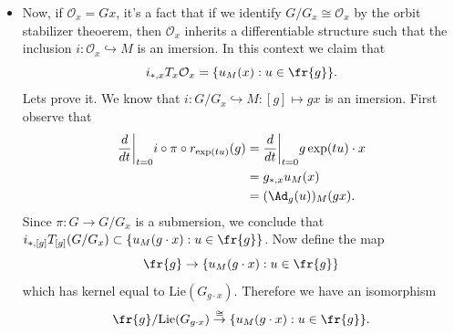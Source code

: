 \begin{itemize}
        \begin{equation}
            \text{Lie}(G_x)=\fr{g}_x.
        \end{equation}
        Let $\exp(tu)\in G_x,\;\forall t\in\bbR$, that is, assume that $u\in\text{Lie}(G_x)$. Then, by definition, we have 
        $\exp(tu)x=x$. So, by differentiating this equation we get $u_M(x)=0$ and $u\in\fr{g}_x$. Conversely, assume that 
        $u\in\fr{g}_x$. Let $g=\exp(ts),\;s\in\bbR$, then 
        \begin{equation}
            \frac{d}{dt}\bigg|_{t=s}\exp(tu)x= g_{*,x}(\frac{d}{dt}\bigg|_{t=0}\exp(tu)x)=0
        \end{equation}
        and $\exp(tu)\cdot x = x,\forall t\in\bbR$. Therefore $u\in\text{Lie}(G_x)$.
        \item Now, if $\mathcal{O}_x=Gx$, it's a fact that if we identify $G/G_x\cong \mathcal{O}_x$ by the 
        orbit stabilizer theoerem, then $\mathcal{O}_x$ inherits a differentiable structure such that the inclusion 
        $i:\mathcal{O}_x\hookrightarrow M$ is an imersion. In this context we claim that 
        \begin{equation}
            i_{*,x}T_x\mathcal{O}_x=\{u_M(x): u\in\fr{g}\}.
        \end{equation}
        Lets prove it. We know that $i:G/G_x\hookrightarrow M:[g]\mapsto gx$ is an imersion. First observe that 
        \begin{equation}
            \begin{split}
                \frac{d}{dt}\bigg|_{t=0}i\circ\pi\circ r_{\exp(tu)}(g)&=\frac{d}{dt}\bigg|_{t=0}g\exp(tu)\cdot x\\
                &=g_{*,x}u_M(x)\\
                &=(\Ad_g(u))_M(gx).
            \end{split}
        \end{equation}
        Since $\pi:G\rightarrow G/G_x$ is a submersion, we conclude that 
        $i_{*,[g]}T_{[g]}(G/G_x)\subset \{u_M(g\cdot x):u\in\fr{g}\}$. Now define the map 
        \begin{equation}
            \fr{g}\to \{u_M(g\cdot x):u\in\fr{g}\}
        \end{equation}
        which has kernel equal to $\text{Lie}(G_{g\cdot x})$. Therefore we have an isomorphism
        \begin{equation}
            \fr{g}/\text{Lie}(G_{g\cdot x})\overset{\cong}{\to}\{u_M(g\cdot x):u\in\fr{g}\}.
        \end{equation}

\end{itemize}
